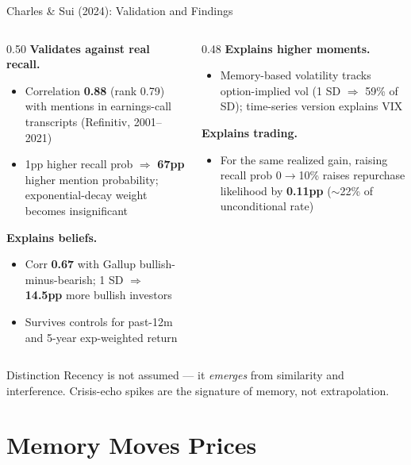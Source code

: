 \documentclass[aspectratio=169, 11pt]{beamer}
\begin{document}
\begin{frame}[shrink=10]{Charles \& Sui (2024): Validation and Findings}
\begin{columns}[T]
\begin{column}{0.50\textwidth}
\textbf{Validates against real recall.}
\begin{itemize}
\item Correlation \textbf{0.88} (rank 0.79) with mentions in earnings-call transcripts (Refinitiv, 2001--2021)
\item 1pp higher recall prob $\Rightarrow$ \textbf{67pp} higher mention probability; exponential-decay weight becomes insignificant
\end{itemize}
\textbf{Explains beliefs.}
\begin{itemize}
\item Corr \textbf{0.67} with Gallup bullish-minus-bearish; 1 SD $\Rightarrow$ \textbf{14.5pp} more bullish investors
\item Survives controls for past-12m and 5-year exp-weighted return
\end{itemize}
\end{column}
\begin{column}{0.48\textwidth}
\textbf{Explains higher moments.}
\begin{itemize}
\item Memory-based volatility tracks option-implied vol (1 SD $\Rightarrow$ 59\% of SD); time-series version explains VIX
\end{itemize}
\textbf{Explains trading.}
\begin{itemize}
\item For the same realized gain, raising recall prob 0$\to$10\% raises repurchase likelihood by \textbf{0.11pp} ($\sim$22\% of unconditional rate)
\end{itemize}
\end{column}
\end{columns}
\vfill
\begin{block}{Distinction}
Recency is not assumed --- it \emph{emerges} from similarity and interference. Crisis-echo spikes are the signature of memory, not extrapolation.
\end{block}
\end{frame}

\section{Memory Moves Prices}
\end{document}
